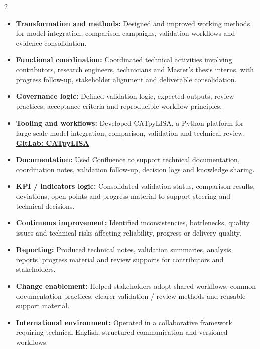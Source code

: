 \documentclass[8pt,a4paper,ragged2e,withhyper]{altacv}
\begin{document}
\begin{paracol}{2}
\begin{itemize}
  \item \textbf{Transformation and methods:} Designed and improved working methods for model integration, comparison campaigns, validation workflows and evidence consolidation.
  \item \textbf{Functional coordination:} Coordinated technical activities involving contributors, research engineers, technicians and Master's thesis interns, with progress follow-up, stakeholder alignment and deliverable consolidation.
  \item \textbf{Governance logic:} Defined validation logic, expected outputs, review practices, acceptance criteria and reproducible workflow principles.
  \item \textbf{Tooling and workflows:} Developed CATpyLISA, a Python platform for large-scale model integration, comparison, validation and technical review.
  \textcolor{DarkPastelRed}{\href{https://gitlab.oca.eu/gboileau/lisa_l3_tools}{\bf GitLab: CATpyLISA}}
  \item \textbf{Documentation:} Used Confluence to support technical documentation, coordination notes, validation follow-up, decision logs and knowledge sharing.
  \item \textbf{KPI / indicators logic:} Consolidated validation status, comparison results, deviations, open points and progress material to support steering and technical decisions.
  \item \textbf{Continuous improvement:} Identified inconsistencies, bottlenecks, quality issues and technical risks affecting reliability, progress or delivery quality.
  \item \textbf{Reporting:} Produced technical notes, validation summaries, analysis reports, progress material and review supports for contributors and stakeholders.
  \item \textbf{Change enablement:} Helped stakeholders adopt shared workflows, common documentation practices, clearer validation / review methods and reusable support material.
  \item \textbf{International environment:} Operated in a collaborative framework requiring technical English, structured communication and versioned workflows.
\end{itemize}

\divider



\end{paracol}
\end{document}
